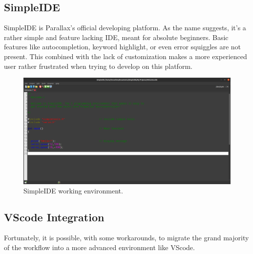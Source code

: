 \documentclass[sigconf,nonacm]{acmart}
\begin{document}
      \subsection{SimpleIDE}

      SimpleIDE is Parallax's official developing platform. As the name
      suggests, it's a rather simple and feature lacking IDE, meant for absolute
      beginners. Basic features like autocompletion, keyword highlight, or even
      error squiggles are not present. This combined with the lack of
      customization makes a more experienced user rather frustrated when trying
      to develop on this platform. 

      \begin{figure}[h]
            \centering
            \includegraphics[scale=0.1]{resources/simple_ide.png}
            \caption{\label{fig:simple_ide}SimpleIDE working environment.}
      \end{figure}


      \subsection{VScode Integration}

      Fortunately, it is possible, with some workarounds, to migrate the grand
      majority of the workflow into a more advanced environment like VScode.
      
\end{document}
